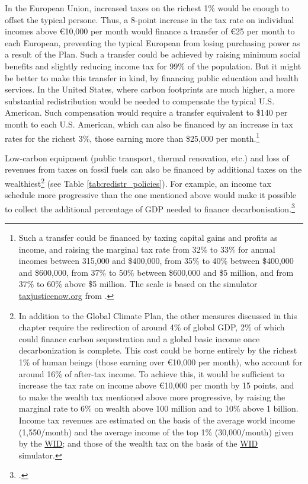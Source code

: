 \documentclass[a5paper,english,openany]{memoir}
\begin{document}
In the European Union, increased taxes on the richest 1\% would be enough to offset the typical persone. Thus, a 8-point increase in the tax rate on individual incomes above \euro{}10,000 per month would finance a transfer of \euro{}25 per month to each European, preventing the typical European from losing purchasing power as a result of the Plan. Such a transfer could be achieved by raising minimum social benefits and slightly reducing income tax for 99\% of the population. But it might be better to make this transfer in kind, by financing public education and health services. In the United States, where carbon footprints are much higher, a more substantial redistribution would be needed to compensate the typical U.S. American. Such compensation would require a transfer equivalent to \$140 per month to each U.S. American, which can also be financed by an increase in tax rates for the richest 3\%, those earning more than \$25,000 per month.\footnote{Such a transfer could be financed by taxing capital gains and profits as income, and raising the marginal tax rate from 32\% to 33\% for annual incomes between 315,000 and \$400,000, from 35\% to 40\% between \$400,000 and \$600,000, from 37\% to 50\% between \$600,000 and \$5 million, and from 37\% to 60\% above \$5 million. The scale is based on the simulator \href{https://taxjusticenow.org/}{taxjusticenow.org} from \cite{saez_triumph_2019}.}%

Low-carbon equipment (public transport, thermal renovation, etc.) and loss of revenues from taxes on fossil fuels can also be financed by additional taxes on the wealthiest\footnote{In addition to the Global Climate Plan, the other measures discussed in this chapter require the redirection of around 4\% of global GDP, 2\% of which could finance carbon sequestration and a global basic income once decarbonization is complete. %
This cost could be borne entirely by the richest 1\% of human beings (those earning over \euro{}10,000 per month), who account for around 16\% of after-tax income. To achieve this, it would be sufficient to increase the tax rate on income above \euro{}10,000 per month by 15 points, and to make the wealth tax mentioned above more progressive, by raising the marginal rate to 6\% on wealth above 100 million and to 10\% above 1 billion. Income tax revenues are estimated on the basis of the average world income (\textit{\texteuro{}}1,550/month) and the average income of the top 1\% (\textit{\texteuro{}}30,000/month) given by the \href{https://wid.world/data/}{WID}; and those of the wealth tax on the basis of the \href{https://wid.world/world-wealth-tax-simulator/}{WID} simulator.
} (see Table \ref{tab:redistr_policies}). 
For example, an income tax schedule more progressive than the one mentioned above would make it possible to collect the additional percentage of GDP needed to finance decarbonisation.\footnote{\citet{aie_net_2021}.} 
\end{document}
